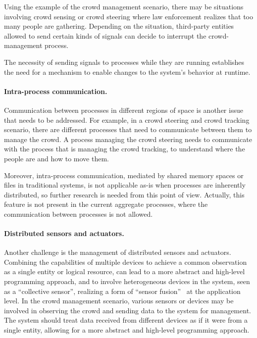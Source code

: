 \documentclass[12pt, a4paper]{article}
\begin{document}
Using the example of the crowd management scenario,
there may be situations involving crowd sensing or crowd steering where law enforcement realizes that too many people are gathering.
%
Depending on the situation,
third-party entities allowed to send certain kinds of signals can decide to interrupt the crowd-management process.

The necessity of sending signals to processes while they are running establishes the need for a mechanism to enable changes to the system's behavior at runtime.

\paragraph{Intra-process communication.}
\label{par:intra-process-communication}
Communication between processes in different regions of space is another issue that needs to be addressed.
%
For example,
in a crowd steering and crowd tracking scenario,
there are different processes that need to communicate between them to manage the crowd.
%
A process managing the crowd steering needs to communicate with the process that is managing the crowd tracking,
to understand where the people are and how to move them.

Moreover, intra-process communication,
mediated by shared memory spaces or files in traditional systems,
is not applicable as-is when processes are inherently distributed,
so further research is needed from this point of view.
%
Actually,
this feature is not present in the current aggregate processes,
where the communication between processes is not allowed. %

\paragraph{Distributed sensors and actuators.}
\label{par:distributed-sensors-and-actuators}
Another challenge is the management of distributed sensors and actuators.
%
Combining the capabilities of multiple devices to achieve a common observation as a single entity or logical resource,
can lead to a more abstract and high-level programming approach,
and to involve heterogeneous devices in the system,
seen as a ``collective sensor'',
realizing a form of ``sensor fusion''~\cite{sasiadek2002sensor} at the application level.
%
In the crowd management scenario,
various sensors or devices may be involved in observing the crowd and sending data to the system for management.
%
The system should treat data received from different devices as if it were from a single entity,
allowing for a more abstract and high-level programming approach.
\\
\end{document}
